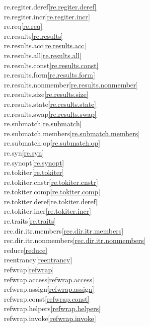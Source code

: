 \begin{multicols}{2}
re.regiter.deref\quad\ref{re.regiter.deref}\\
re.regiter.incr\quad\ref{re.regiter.incr}\\
re.req\quad\ref{re.req}\\
re.results\quad\ref{re.results}\\
re.results.acc\quad\ref{re.results.acc}\\
re.results.all\quad\ref{re.results.all}\\
re.results.const\quad\ref{re.results.const}\\
re.results.form\quad\ref{re.results.form}\\
re.results.nonmember\quad\ref{re.results.nonmember}\\
re.results.size\quad\ref{re.results.size}\\
re.results.state\quad\ref{re.results.state}\\
re.results.swap\quad\ref{re.results.swap}\\
re.submatch\quad\ref{re.submatch}\\
re.submatch.members\quad\ref{re.submatch.members}\\
re.submatch.op\quad\ref{re.submatch.op}\\
re.syn\quad\ref{re.syn}\\
re.synopt\quad\ref{re.synopt}\\
re.tokiter\quad\ref{re.tokiter}\\
re.tokiter.cnstr\quad\ref{re.tokiter.cnstr}\\
re.tokiter.comp\quad\ref{re.tokiter.comp}\\
re.tokiter.deref\quad\ref{re.tokiter.deref}\\
re.tokiter.incr\quad\ref{re.tokiter.incr}\\
re.traits\quad\ref{re.traits}\\
rec.dir.itr.members\quad\ref{rec.dir.itr.members}\\
rec.dir.itr.nonmembers\quad\ref{rec.dir.itr.nonmembers}\\
reduce\quad\ref{reduce}\\
reentrancy\quad\ref{reentrancy}\\
refwrap\quad\ref{refwrap}\\
refwrap.access\quad\ref{refwrap.access}\\
refwrap.assign\quad\ref{refwrap.assign}\\
refwrap.const\quad\ref{refwrap.const}\\
refwrap.helpers\quad\ref{refwrap.helpers}\\
refwrap.invoke\quad\ref{refwrap.invoke}\\

\end{multicols}
